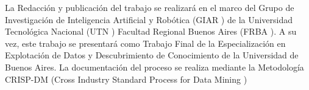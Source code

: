 La Redacción y publicación del trabajo se realizará en el marco del Grupo de Investigación de Inteligencia Artificial y Robótica (GIAR ) de la Universidad Tecnológica Nacional (UTN ) Facultad Regional Buenos Aires (FRBA ). A su vez, este trabajo se presentará como Trabajo Final de la Especialización en Explotación de Datos y Descubrimiento de Conocimiento de la Universidad
de Buenos Aires.
La documentación del proceso se realiza mediante la Metodología CRISP-DM (Cross Industry Standard Process for Data Mining )